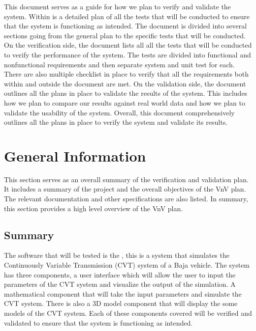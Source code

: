 \documentclass[12pt, titlepage]{article}
\begin{document}
\newpage


\noindent This document serves as a guide for how we plan to verify and validate the \progname{} system.
Within is a detailed plan of all the tests that will be conducted to ensure that the system is functioning as intended.
The document is divided into several sections going from the general plan to the specific tests that will be conducted.
On the verification side, the document lists all all the tests that will be conducted to verify the performance of the system.
The tests are divided into functional and nonfunctional requirements and then separate system and unit test for each.
There are also multiple checklist in place to verify that all the requirements both within and outside the document are met.
On the validation side, the document outlines all the plans in place to validate the results of the system.
This includes how we plan to compare our results against real world data and how we plan to validate the usability of the system.
Overall, this document comprehensively outlines all the plans in place to verify the system and validate its results.

\section{General Information}

This section serves as an overall summary of the verification and validation plan.
It includes a summary of the project and the overall objectives of the VnV plan.
The relevant documentation and other specifications are also listed.
In summary, this section provides a high level overview of the VnV plan.

\subsection{Summary}

The software that will be tested is the \progname{}, this is a system that simulates the Continuously Variable Transmission (CVT) system of a Baja vehicle.
The system has three components, a user interface which will allow the user to input the parameters of the CVT system and visualize the output of the simulation.
A mathematical component that will take the input parameters and simulate the CVT system.
There is also a 3D model component that will display the some models of the CVT system. 
Each of these components covered will be verified and validated to ensure that the system is functioning as intended.
\end{document}
